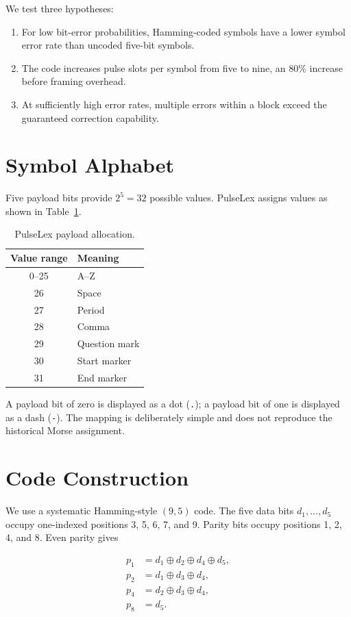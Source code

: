\documentclass[11pt,a4paper]{article}
\begin{document}
We test three hypotheses:
\begin{enumerate}
  \item For low bit-error probabilities, Hamming-coded symbols have a lower
  symbol error rate than uncoded five-bit symbols.
  \item The code increases pulse slots per symbol from five to nine, an
  80\% increase before framing overhead.
  \item At sufficiently high error rates, multiple errors within a block
  exceed the guaranteed correction capability.
\end{enumerate}

\section{Symbol Alphabet}
Five payload bits provide $2^5=32$ possible values. PulseLex assigns values
as shown in Table~\ref{tab:alphabet}.

\begin{table}[h]
\centering
\caption{PulseLex payload allocation.}
\label{tab:alphabet}
\begin{tabular}{cl}
\toprule
Value range & Meaning \\
\midrule
0--25 & A--Z \\
26 & Space \\
27 & Period \\
28 & Comma \\
29 & Question mark \\
30 & Start marker \\
31 & End marker \\
\bottomrule
\end{tabular}
\end{table}

A payload bit of zero is displayed as a dot (\texttt{.}); a payload bit of one
is displayed as a dash (\texttt{-}). The mapping is deliberately simple and
does not reproduce the historical Morse assignment.

\section{Code Construction}
We use a systematic Hamming-style $(9,5)$ code. The five data bits
$d_1,\ldots,d_5$ occupy one-indexed positions 3, 5, 6, 7, and 9. Parity bits
occupy positions 1, 2, 4, and 8. Even parity gives

\begin{align}
p_1 &= d_1 \oplus d_2 \oplus d_4 \oplus d_5,\\
p_2 &= d_1 \oplus d_3 \oplus d_4,\\
p_4 &= d_2 \oplus d_3 \oplus d_4,\\
p_8 &= d_5.
\end{align}
\end{document}

